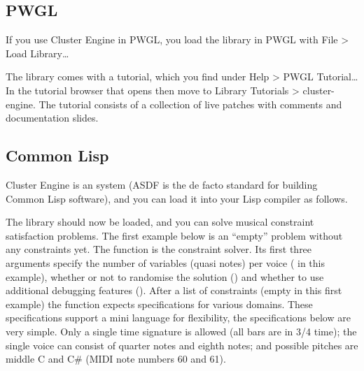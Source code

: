 \documentclass[letterpaper,10pt,english]{sphinxmanual}
\begin{document}
\subsection{PWGL}
\label{\detokenize{readme:id3}}
If you use Cluster Engine in PWGL, you load the library in PWGL with File \textgreater{} Load Library…

The library comes with a tutorial, which you find under Help \textgreater{} PWGL Tutorial… In the tutorial browser that opens then move to Library Tutorials \textgreater{} cluster-engine. The tutorial consists of a collection of live patches with comments and documentation slides.


\subsection{Common Lisp}
\label{\detokenize{readme:id4}}
Cluster Engine is an  system (ASDF is the de facto standard for building Common Lisp software), and you can load it into your Lisp compiler as follows.

\begin{sphinxVerbatim}[commandchars=\\\{\}]
 
\end{sphinxVerbatim}

The library should now be loaded, and you can solve musical constraint satisfaction problems. The first example below is an “empty” problem without any constraints yet. The function  is the constraint solver. Its first three arguments specify the number of variables (quasi notes) per voice ( in this example), whether or not to randomise the solution () and whether to use additional debugging features ().  After a list of constraints (empty in this first example) the function expects specifications for various domains. These specifications support a mini language for flexibility, the specifications below are very simple. Only a single time signature is allowed (all bars are in 3/4 time); the single voice can consist of quarter notes and eighth notes; and possible pitches are middle C and C\# (MIDI note numbers 60 and 61).

\begin{sphinxVerbatim}[commandchars=\\\{\}]
               
                   
          
    
\end{sphinxVerbatim}
\end{document}
